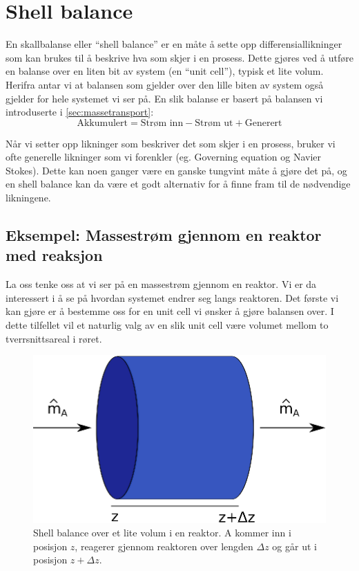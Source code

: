 \clearpage
\section{Shell balance}\label{sec:shell_balance}
En skallbalanse eller ``shell balance'' er en måte å sette opp differensiallikninger som kan brukes til å beskrive hva som skjer i en prosess. Dette gjøres ved å utføre en balanse over en liten bit av system (en ``unit cell''), typisk et lite volum. Herifra antar vi at balansen som gjelder over den lille biten av system også gjelder for hele systemet vi ser på. En slik balanse er basert på balansen vi introduserte i \cref{sec:massetransport}:
\begin{equation}
    \label{eq:gen_balance}
    \text{Akkumulert} = \text{Strøm inn} - \text{Strøm ut} + \text{Generert}
\end{equation}

Når vi setter opp likninger som beskriver det som skjer i en prosess, bruker vi ofte generelle likninger som vi forenkler (eg. Governing equation og Navier Stokes). Dette kan noen ganger være en ganske tungvint måte å gjøre det på, og en shell balance kan da være et godt alternativ for å finne fram til de nødvendige likningene. 

\subsection{Eksempel: Massestrøm gjennom en reaktor med reaksjon}
La oss tenke oss at vi ser på en massestrøm gjennom en reaktor. Vi er da interessert i å se på hvordan systemet endrer seg langs reaktoren. Det første vi kan gjøre er å bestemme oss for en unit cell vi ønsker å gjøre balansen over. I dette tilfellet vil et naturlig valg av en slik unit cell være volumet mellom to tverrsnittsareal i røret. 
\begin{figure}[H]
    \centering
    \includegraphics[scale=0.8]{Figures/reactor.eps}
    \caption{Shell balance over et lite volum i en reaktor. A kommer inn i posisjon $z$, reagerer gjennom reaktoren over lengden $\Delta z$ og går ut i posisjon $z+\Delta z$.}
    \label{fig:shell_balance}
\end{figure}

